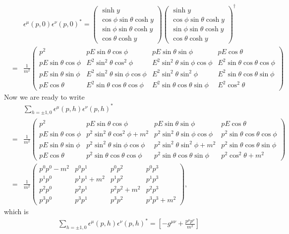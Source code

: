 \documentclass[11pt]{article}
\def\eps{\epsilon}
\begin{document}
\begin{eqnarray}
    &&\eps^\mu(p,0) \eps^\nu(p,0)^* = 
    \begin{pmatrix}
        \sinh y \\ \cos\phi\sin\theta\cosh y \\ \sin\phi\sin\theta\cosh y \\ \cos\theta\cosh y
    \end{pmatrix}
    \begin{pmatrix}
        \sinh y \\ \cos\phi\sin\theta\cosh y \\ \sin\phi\sin\theta\cosh y \\ \cos\theta\cosh y
    \end{pmatrix}^\dagger \nonumber \\
    &=& \frac{1}{m^2}
    \begin{pmatrix}
        p^2 & pE\sin\theta\cos\phi & pE\sin\theta\sin\phi & pE\cos\theta \\
        pE\sin\theta\cos\phi & E^2\sin^2\theta\cos^2\phi & E^2\sin^2\theta\sin\phi\cos\phi & E^2 \sin\theta\cos\theta\cos\phi \\
        pE\sin\theta\sin\phi & E^2 \sin^2\theta\sin\phi\cos\phi & E^2 \sin^2\theta\sin^2\phi & E^2\sin\theta\cos\theta\sin\phi \\
        pE \cos\theta & E^2 \sin\theta\cos\theta\cos\phi & E^2 \sin\theta\cos\theta\sin\phi & E^2\cos^2\theta 
    \end{pmatrix} \nonumber 
\end{eqnarray}
Now we are ready to write
\begin{eqnarray}
    &&\sum_{h=\pm1,0} \eps^\mu(p,h) \eps^\nu(p,h)^* \nonumber \\&=&  \frac{1}{m^2}
    \begin{pmatrix}
        p^2 & pE\sin\theta\cos\phi & pE\sin\theta\sin\phi & pE\cos\theta \\
        pE\sin\theta\cos\phi & p^2\sin^2\theta\cos^2\phi+m^2 & p^2 \sin^2\theta\sin\phi\cos\phi & p^2\sin\theta\cos\theta\cos\phi \\
        pE\sin\theta\sin\phi & p^2 \sin^2\theta\sin\phi\cos\phi & p^2\sin^2\theta\sin^2\phi + m^2 & p^2 \sin\theta\cos\theta\sin\phi \\ 
        pE \cos\theta & p^2\sin\theta\cos\theta\cos\phi & p^2\sin\theta\cos\theta\sin\phi & p^2\cos^2\theta+m^2
        \end{pmatrix}\nonumber \\
        &=& \frac{1}{m^2} 
        \begin{pmatrix}
            p^0p^0-m^2 & p^0p^1 & p^0p^2 & p^0p^3 \\
            p^1p^0 & p^1p^1+m^2 & p^1p^2 & p^1p^3 \\
            p^2p^0 & p^2p^1 & p^2p^2+m^2 & p^2p^3 \\
            p^3p^0 & p^3p^1 & p^3p^2 & p^3p^3+m^2 
        \end{pmatrix},
\end{eqnarray}
which is
\begin{eqnarray}
    \sum_{h=\pm1,0} \eps^\mu(p,h) \eps^\nu(p,h)^*
  = [ -g^{\mu\nu} + \frac{p^\mu p^\nu}{m^2} ]
\end{eqnarray}
\end{document}
